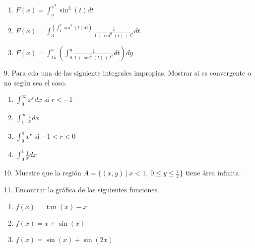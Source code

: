 \documentclass[12pt]{article}
\begin{document}
\begin{enumerate}[\hspace{9px} a)]
    \item \(F(x)=\displaystyle\int_{a}^{x^3}\sin^3(t)dt\)

    \item \(F(x)=\displaystyle\int_{3}^{\left(\displaystyle\int_{1}^{x}\sin^3(t)dt\right)}\frac{1}{1+\sin^6(t)+t^2}dt\)

    \item \(F(x)=\displaystyle\int_{15}^{x}\left(\int_{8}^{y}\frac{1}{1+\sin^2(t)+t^2}dt\right)dy\)

\end{enumerate}

9. Para cda una de las siguiente integrales impropias. Mostrar si es convergente o no seg\'un sea el caso.

\begin{enumerate}[\hspace{9px} a)]
    \item \(\displaystyle\int_{0}^{\infty}x^rdx\) si $r<-1$

    \item \(\displaystyle\int_{1}^{\infty}\frac{1}{x}dx\)

    \item \(\displaystyle\int_{0}^{a}x^r\) si $-1<r<0$

    \item \(\displaystyle\int_{0}^{1}\frac{1}{x}dx\)

\end{enumerate}

10. Muestre que la regi\'on \(A=\{(x,y) \ | \ x<1, \ 0 \leq y \leq \frac{1}{x}\}\) tiene \'area infinita.

11. Encontrar la gr\'afica de las siguientes funciones.

\begin{enumerate}[\hspace{9px} a)]
    \item \(f(x)=\tan(x)-x\)

    \item \(f(x)=x+\sin(x)\)

    \item \(f(x)=\sin(x)+\sin(2x)\)

\end{enumerate}
\end{document}

